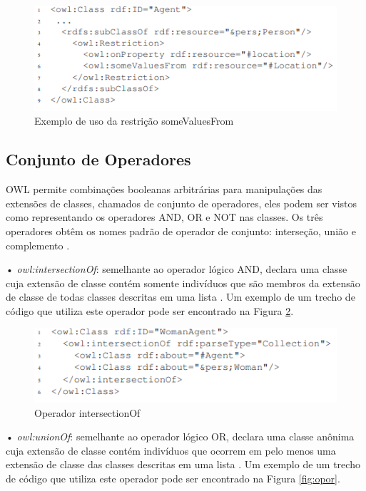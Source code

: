 \documentclass{bcc}
\begin{document}
\begin{figure}[H]
\centering
\includegraphics[width=.9\textwidth]{Figuras/some_values.PNG}
\caption{Exemplo de uso da restrição someValuesFrom}
\label{fig:somevalues}
\end{figure}

\subsection{Conjunto de Operadores}

OWL permite combinações booleanas arbitrárias para manipulações das extensões de classes, chamados de conjunto de operadores, eles podem ser vistos como representando os operadores AND, OR e NOT nas classes. Os três operadores obtêm os nomes padrão de operador de conjunto: interseção, união e complemento \cite{bechhofer2004}.

• \textit{owl:intersectionOf}: semelhante ao operador lógico AND, declara uma classe cuja extensão de classe contém somente indivíduos que são membros da extensão de classe de todas classes descritas em uma lista \cite{bechhofer2004}. Um exemplo de um trecho de código que utiliza este operador pode ser encontrado na Figura \ref{fig:opand}.

\begin{figure}[H]
\centering
\includegraphics[width=.9\textwidth]{Figuras/op_and.PNG}
\caption{Operador intersectionOf}
\label{fig:opand}
\end{figure}


• \textit{owl:unionOf}: semelhante ao operador lógico OR, declara uma classe anônima cuja extensão de classe contém indivíduos que ocorrem em pelo menos uma extensão de classe das classes descritas em uma lista \cite{bechhofer2004}. Um exemplo de um trecho de código que utiliza este operador pode ser encontrado na Figura \ref{fig:opor}.
\end{document}
